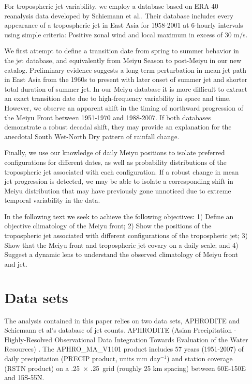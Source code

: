 \documentclass[draft,grl]{AGUTeX}
\begin{document}
\begin{article}
For tropospheric jet variability, we employ a database based on ERA-40 reanalysis data developed by Schiemann et al.\citet{Schiemann2009}. Their database includes every appearance of a tropospheric jet in East Asia for 1958-2001 at 6-hourly intervals using simple criteria: Positive zonal wind and local maximum in excess of 30 m/s.

	We first attempt to define a transition date from spring to summer behavior in the jet database, and equivalently from Meiyu Season to post-Meiyu in our new catalog. Preliminary evidence suggests a long-term perturbation in mean jet path in East Asia from the 1960s to present with later onset of summer jet and shorter total duration of summer jet. In our Meiyu database it is more difficult to extract an exact transition date due to high-frequency variability in space and time. However, we observe an apparent shift in the timing of northward progression of the Meiyu Front between 1951-1970 and 1988-2007. If both databases demonstrate a robust decadal shift, they may provide an explanation for the anecdotal South Wet-North Dry pattern of rainfall change.

	Finally, we use our knowledge of daily Meiyu positions to isolate preferred configurations for different dates, as well as probability distributions of the tropospheric jet associated with each configuration. If a robust change in mean jet progression is detected, we may be able to isolate a corresponding shift in Meiyu distribution that may have previously gone unnoticed due to extreme temporal variability in the data.

	In the following text we seek to achieve the following objectives: 1) Define an objective climatology of the Meiyu front; 2) Show the positions of the tropospheric jet associated with different configurations of the tropospheric jet; 3) Show that the Meiyu front and tropospheric jet covary on a daily scale; and 4) Suggest a dynamic lens to understand the observed climatology of Meiyu front and jet.
	
\section{Data sets}
The analysis contained in this paper relies on two data sets, APHRODITE and Schiemann et al's database of jet counts. APHRODITE (Asian Precipitation - Highly-Resolved Observational Data Integration Towards Evaluation of the Water Resources) \citep{Yatagai2012}. The APHRO\_MA\_V1101 product includes 57 years (1951-2007) of daily precipitation (PRECIP product, units mm day$^{-1}$) and station coverage (RSTN product) on a .25\textdegree\ $\times$ .25\textdegree\ grid (roughly 25 km spacing) between 60\textdegree E-150\textdegree E and 15\textdegree S-55\textdegree N.


\end{article}
\end{document}
